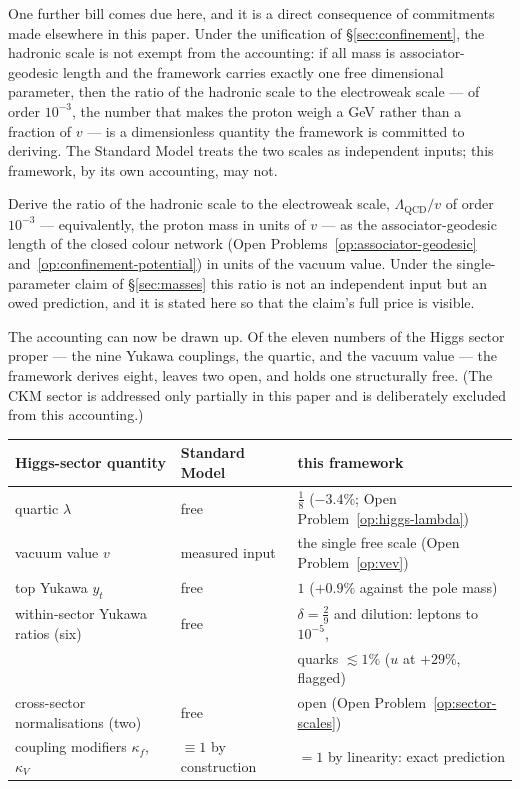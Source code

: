 One further bill comes due here, and it is a direct consequence of commitments made elsewhere in
this paper. Under the unification of \S\ref{sec:confinement}, the hadronic scale is not exempt from
the accounting: if all mass is associator-geodesic length and the framework carries exactly one free
dimensional parameter, then the ratio of the hadronic scale to the electroweak scale --- of order
$10^{-3}$, the number that makes the proton weigh a GeV rather than a fraction of $v$ --- is a
dimensionless quantity the framework is committed to deriving. The Standard Model treats the two
scales as independent inputs; this framework, by its own accounting, may not.

\begin{openproblem}\label{op:qcd-scale}
Derive the ratio of the hadronic scale to the electroweak scale, $\Lambda_{\mathrm{QCD}}/v$ of order
$10^{-3}$ --- equivalently, the proton mass in units of $v$ --- as the associator-geodesic length of
the closed colour network (Open Problems~\ref{op:associator-geodesic}
and~\ref{op:confinement-potential}) in units of the vacuum value. Under the single-parameter claim of
\S\ref{sec:masses} this ratio is not an independent input but an owed prediction, and it is stated
here so that the claim's full price is visible.
\end{openproblem}

The accounting can now be drawn up. Of the eleven numbers of the Higgs sector proper --- the nine
Yukawa couplings, the quartic, and the vacuum value --- the framework derives eight, leaves two open,
and holds one structurally free. (The CKM sector is addressed only partially in this paper and is
deliberately excluded from this accounting.)

\begin{center}
\begin{tabular}{lll}
\hline
Higgs-sector quantity & Standard Model & this framework \\
\hline
quartic $\lambda$ & free & $\tfrac18$ ($-3.4\%$; Open Problem~\ref{op:higgs-lambda}) \\
vacuum value $v$ & measured input & the single free scale (Open Problem~\ref{op:vev}) \\
top Yukawa $y_t$ & free & $1$ ($+0.9\%$ against the pole mass) \\
within-sector Yukawa ratios (six) & free & $\delta = \tfrac29$ and dilution: leptons to $10^{-5}$, \\
 & & quarks $\lesssim 1\%$ ($u$ at $+29\%$, flagged) \\
cross-sector normalisations (two) & free & open (Open Problem~\ref{op:sector-scales}) \\
coupling modifiers $\kappa_f$, $\kappa_V$ & $\equiv 1$ by construction & $= 1$ by linearity: exact prediction \\
\hline
\end{tabular}
\end{center}

